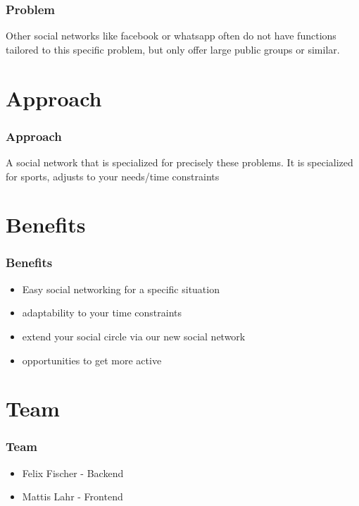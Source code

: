 \documentclass[aspectratio=169]{beamer}
\begin{document}
	\begin{frame}
		\frametitle{Problem}
		Other social networks like facebook or whatsapp often do not have functions tailored to this specific problem, but only offer large public groups or similar. 
	\end{frame}

\section{Approach}

	\begin{frame}
		\frametitle{Approach}
		A social network that is specialized for precisely these problems. It is specialized for sports, adjusts to your needs/time constraints 
	\end{frame}


\section{Benefits}

	\begin{frame}
		\frametitle{Benefits}
		\begin{itemize}
			\item Easy social networking for a specific situation
			\item adaptability to your time constraints
			\item extend your social circle via our new social network
			\item opportunities to get more active
		\end{itemize}
	\end{frame}

\section{Team}

	\begin{frame}
		\frametitle{Team}
		\begin{itemize}
			\item Felix Fischer - Backend 
			\item Mattis Lahr - Frontend
		\end{itemize}
	\end{frame}
\end{document}
